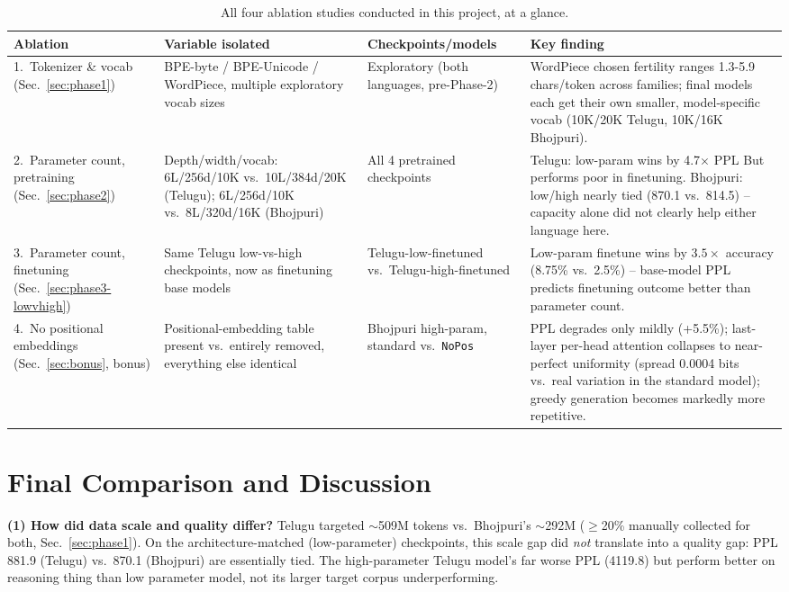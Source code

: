 \documentclass[10pt,a4paper]{article}
\begin{document}
\begin{table}[H]\centering\footnotesize
\begin{tabular}{p{2.6cm}p{4.6cm}p{2.8cm}p{4.6cm}}
\toprule
Ablation & Variable isolated & Checkpoints/models & Key finding \\
\midrule
1.\ Tokenizer \& vocab (Sec.~\ref{sec:phase1}) &
  BPE-byte / BPE-Unicode / WordPiece, multiple exploratory vocab sizes &
  Exploratory (both languages, pre-Phase-2) &
  WordPiece chosen fertility ranges 1.3-5.9 chars/token
  across families; final models each get their own smaller, model-specific vocab (10K/20K
  Telugu, 10K/16K Bhojpuri). \\
2.\ Parameter count, pretraining (Sec.~\ref{sec:phase2}) &
  Depth/width/vocab: 6L/256d/10K vs.\ 10L/384d/20K (Telugu); 6L/256d/10K vs.\ 8L/320d/16K
  (Bhojpuri) &
  All 4 pretrained checkpoints &
  Telugu: low-param wins by 4.7$\times$ PPL But performs poor in finetuning. Bhojpuri: low/high nearly tied (870.1 vs.\ 814.5) -- capacity
  alone did not clearly help either language here. \\
3.\ Parameter count, finetuning (Sec.~\ref{sec:phase3-lowvhigh}) &
  Same Telugu low-vs-high checkpoints, now as finetuning base models &
  Telugu-low-finetuned vs.\ Telugu-high-finetuned &
  Low-param finetune wins by $3.5\times$ accuracy (8.75\% vs.\ 2.5\%) -- base-model PPL predicts
  finetuning outcome better than parameter count. \\
4.\ No positional embeddings (Sec.~\ref{sec:bonus}, bonus) &
  Positional-embedding table present vs.\ entirely removed, everything else identical &
  Bhojpuri high-param, standard vs.\ \texttt{NoPos} &
  PPL degrades only mildly (+5.5\%); last-layer per-head attention collapses to near-perfect
  uniformity (spread 0.0004 bits vs.\ real variation in the standard model); greedy generation
  becomes markedly more repetitive. \\
\bottomrule
\end{tabular}
\caption{All four ablation studies conducted in this project, at a glance.}
\label{tab:ablation-summary}
\end{table}

\section{Final Comparison and Discussion}
\label{sec:discussion}
\textbf{(1) How did data scale and quality differ?} Telugu targeted $\sim$509M tokens vs.\
Bhojpuri's $\sim$292M ($\geq$20\% manually collected for both, Sec.~\ref{sec:phase1}). On the
architecture-matched (low-parameter) checkpoints, this scale gap did \emph{not} translate into a
quality gap: PPL 881.9 (Telugu) vs.\ 870.1 (Bhojpuri) are essentially tied. The high-parameter
Telugu model's far worse PPL (4119.8) but perform better on reasoning thing than low parameter model, not its larger target
corpus underperforming.
\end{document}

